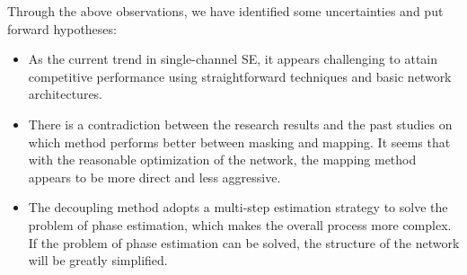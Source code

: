 \documentclass{INTERSPEECH2023}
\begin{document}
Through the above observations, we have identified some uncertainties and put forward hypotheses:

\begin{itemize}
    \item As the current trend in single-channel SE, it appears challenging to attain competitive performance using straightforward techniques and basic network architectures.
    \item There is a contradiction between the research results and the past studies \cite{DCUNET,wu2023rethinking} on which method performs better between masking and mapping. It seems that with the reasonable optimization of the network, the mapping method appears to be more direct and less aggressive.
    \item The decoupling method adopts a multi-step estimation strategy to solve the problem of phase estimation, which makes the overall process more complex. If the problem of phase estimation can be solved, the structure of the network will be greatly simplified.    
\end{itemize}
\end{document}
